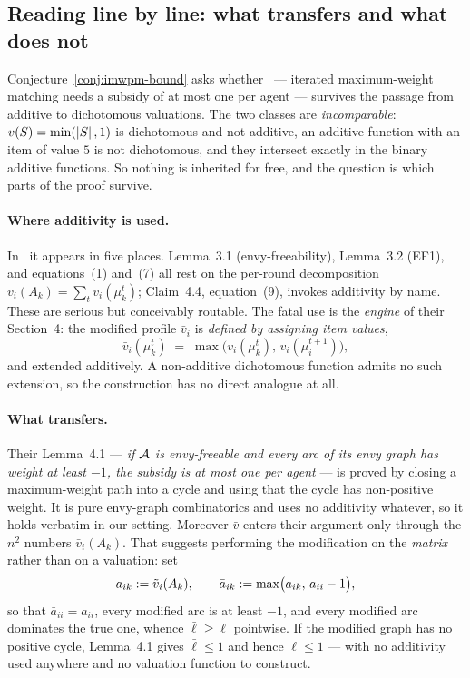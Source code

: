 \subsection{Reading \texorpdfstring{\cite{BDNSV20}}{BDNSV20} line by line: what
transfers and what does not}
\label{sec:approach6-bdnsv-audit}

Conjecture~\ref{conj:imwpm-bound} asks whether~\cite[Theorem~1.3]{BDNSV20} ---
iterated maximum-weight matching needs a subsidy of at most one per agent ---
survives the passage from additive to dichotomous valuations. The two classes are
\emph{incomparable}: $v(S) = \min(\left\lvert S\right\rvert,1)$ is dichotomous and not additive,
an additive function with an item of value $5$ is not dichotomous, and they
intersect exactly in the binary additive functions. So nothing is inherited for
free, and the question is which parts of the proof survive.

\paragraph{Where additivity is used.} In~\cite{BDNSV20} it appears in five
places. Lemma~3.1 (envy-freeability), Lemma~3.2 (EF1), and equations~(1)
and~(7) all rest on the per-round decomposition $v_i(A_k) = \sum_t
v_i(\mu_k^t)$; Claim~4.4, equation~(9), invokes additivity by name. These are
serious but conceivably routable. The fatal use is the \emph{engine} of their
Section~4: the modified profile $\bar v_i$ is \emph{defined by assigning item
values},
\[
  \bar v_i(\mu_k^t) \;=\; \max\bigl(v_i(\mu_k^t),\, v_i(\mu_i^{t+1})\bigr),
\]
and extended additively. A non-additive dichotomous function admits no such
extension, so the construction has no direct analogue at all.

\paragraph{What transfers.} Their Lemma~4.1 --- \emph{if $\mathcal{A}$ is
envy-freeable and every arc of its envy graph has weight at least $-1$, the
subsidy is at most one per agent} --- is proved by closing a maximum-weight path
into a cycle and using that the cycle has non-positive weight. It is pure
envy-graph combinatorics and uses no additivity whatever, so it holds verbatim in
our setting. Moreover $\bar v$ enters their argument only through the $n^2$
numbers $\bar v_i(A_k)$. That suggests performing the modification on the
\emph{matrix} rather than on a valuation: set
\[
  a_{ik} := \tilde v_i(A_{k}),
  \qquad
  \bar a_{ik} := \max\bigl(a_{ik},\, a_{ii} - 1\bigr),
\]
so that $\bar a_{ii} = a_{ii}$, every modified arc is at least $-1$, and every
modified arc dominates the true one, whence $\bar\ell \ge \ell$ pointwise. If the
modified graph has no positive cycle, Lemma~4.1 gives $\bar\ell \le 1$ and hence
$\ell \le 1$ --- with no additivity used anywhere and no valuation function to
construct.

